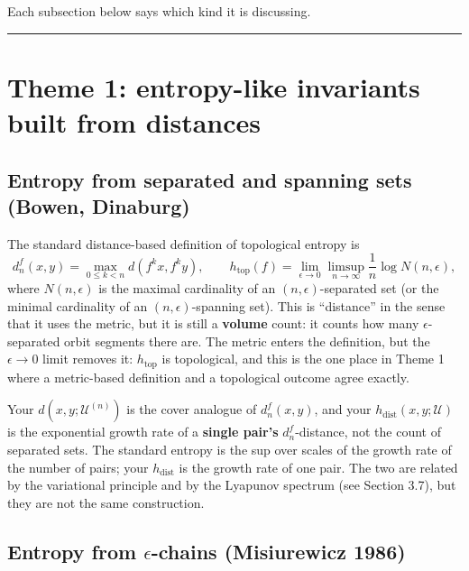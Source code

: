 \documentclass[
]{article}
\begin{document}
Each subsection below says which kind it is discussing.

\begin{center}\rule{0.5\linewidth}{0.5pt}\end{center}

\section{Theme 1: entropy-like invariants built from
distances}\label{theme-1-entropy-like-invariants-built-from-distances}

\subsection{Entropy from separated and spanning sets (Bowen,
Dinaburg)}\label{entropy-from-separated-and-spanning-sets-bowen-dinaburg}

The standard distance-based definition of topological entropy is \[
d_n^f(x,y)=\max_{0\le k<n}d(f^k x,f^k y),\qquad
h_{\mathrm{top}}(f)=\lim_{\epsilon\to0}\limsup_{n\to\infty}\frac1n\log N(n,\epsilon),
\] where \(N(n,\epsilon)\) is the maximal cardinality of an
\((n,\epsilon)\)-separated set (or the minimal cardinality of an
\((n,\epsilon)\)-spanning set). This is ``distance'' in the sense that
it uses the metric, but it is still a \textbf{volume} count: it counts
how many \(\epsilon\)-separated orbit segments there are. The metric
enters the definition, but the \(\epsilon\to0\) limit removes it:
\(h_{\mathrm{top}}\) is topological, and this is the one place in Theme
1 where a metric-based definition and a topological outcome agree
exactly.

Your \(d(x,y;\mathcal U^{(n)})\) is the cover analogue of
\(d_n^f(x,y)\), and your \(h_{\mathrm{dist}}(x,y;\mathcal U)\) is the
exponential growth rate of a \textbf{single pair's} \(d_n^f\)-distance,
not the count of separated sets. The standard entropy is the sup over
scales of the growth rate of the number of pairs; your
\(h_{\mathrm{dist}}\) is the growth rate of one pair. The two are
related by the variational principle and by the Lyapunov spectrum (see
Section 3.7), but they are not the same construction.

\subsection{\texorpdfstring{Entropy from \(\epsilon\)-chains
(Misiurewicz
1986)}{Entropy from \textbackslash epsilon-chains (Misiurewicz 1986)}}\label{entropy-from-epsilon-chains-misiurewicz-1986}
\end{document}
